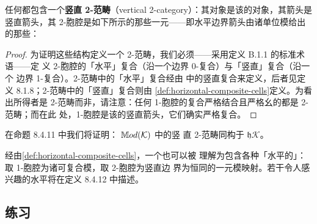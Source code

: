 \begin{proposition}[虚拟装备中的竖直 2-范畴]\label{prop:vertical-two-category}
任何\trVirtualEquipment{}都包含一个\textbf{竖直 2-范畴}（vertical
2-category）：其对象是该\trVirtualEquipment{}的对象，其箭头是竖直箭头，其
2-胞腔是如下所示的那些一元\trCell——即水平边界箭头由诸单位模给出的那些：
\begin{center}
\end{center}
\end{proposition}

\begin{proof}
为证明这些结构定义一个 2-范畴，我们必须——采用定义 B.1.1 的标准术语——定
义 2-胞腔的「水平」复合（沿一个边界 0-\trCell{}复合）与「竖直」复合（沿一个
边界 1-\trCell{}复合）。2-范畴中的「水平」复合经由\trVirtualDoubleCategory{}%
中的竖直复合来定义，后者见定义 8.1.8；2-范畴中的「竖直」复合则由%
\cref{def:horizontal-composite-cells}定义。为看出所得者是 2-范畴而非\trBicategory，请注意：任何 1-胞腔的复合严格结合且严格幺的\trBicategory{}都是 2-范畴；而在此
处，1-胞腔是该\trVirtualDoubleCategory{}的竖直箭头，它们确实严格复合。
\end{proof}

在命题 8.4.11 中我们将证明：\trVirtualEquipment{} $\mathbb{M}od(\mathcal{K})$ 中的竖
直 2-范畴同构于\trHomotopyTwoCategory{} $\mathfrak{h}\mathcal{K}$。

\begin{remark}\label{rem:horizontal-bicategories}
经由\cref{def:horizontal-composite-cells}，一个\trVirtualEquipment{}也可以被
理解为包含各种「水平的」\trBicategory：取 1-胞腔为诸可复合模，取 2-胞腔为竖直边
界\trFunctor{}为恒同的一元模映射。若干令人感兴趣的水平\trBicategory{}将在定义
8.4.12 中描述。
\end{remark}

\subsection*{练习}

